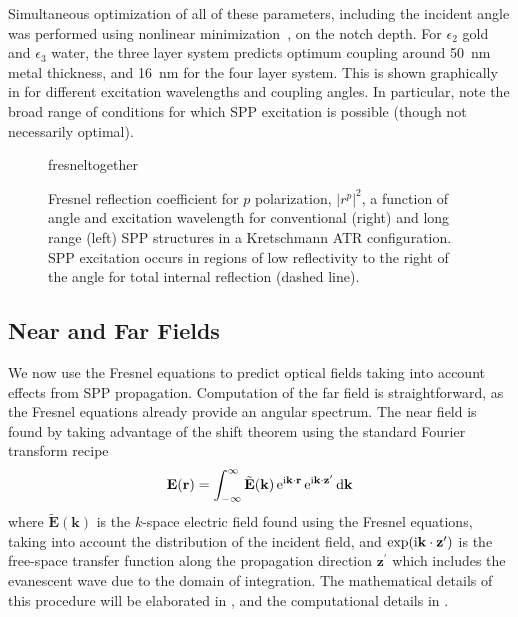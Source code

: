 Simultaneous optimization of all of these parameters, including the
incident angle was performed using nonlinear
minimization~\cite{brent1973algorithms}, on the notch depth.  For
$\epsilon_2$ gold and $\epsilon_3$ water, the three layer system predicts
optimum coupling around \SI{50}{\nano\meter} metal thickness, and
\SI{16}{\nano\meter} for the four layer system.  This is shown graphically
in  for different excitation wavelengths and
coupling angles.  In particular, note the broad range of conditions for
which SPP excitation is possible (though not necessarily optimal).

\begin{figure}[ht]
\centering
{fresneltogether}
\caption{Fresnel reflection coefficient for $p$ polarization, $|r^p|^2$, a
function of angle and excitation wavelength for conventional (right) and
long range (left) SPP structures in a Kretschmann ATR configuration.  SPP
excitation occurs in regions of low reflectivity to the right of the angle
for total internal reflection (dashed line).}
\label{fig:fresnelangle}
\end{figure}

\subsection{Near and Far Fields} \label{sec:fresnelnearfar}
We now use the Fresnel equations to predict optical fields taking into
account effects from SPP propagation.  Computation of the far field is
straightforward, as the Fresnel equations already provide an angular
spectrum.  The near field is found by taking advantage of the shift theorem
using the standard Fourier transform recipe
\begin{equation}
\mathbf{E}(\mathbf{r}) = \int_{-\infty}^{\infty} \tilde{\mathbf{E}}(\mathbf{k})
\,{\mathrm{e}}^{{\mathrm{i}} \mathbf{k} \cdot \mathbf{r}}
\,{\mathrm{e}}^{{\mathrm{i}} \mathbf{k} \cdot \mathbf{z}^\prime} \,\mathrm{d} \mathbf{k}
\end{equation}
where $\tilde{\mathbf{E}}(\mathbf{k})$ is the $k$-space electric field
found using the Fresnel equations, taking into account the distribution of
the incident field, and $\exp({\mathrm{i}} \mathbf{k} \cdot
\mathbf{z}^\prime)$ is the free-space transfer function along the 
propagation direction $\mathbf{z}^\prime$ which includes the evanescent
wave due to the domain of integration.  The mathematical details of this procedure
will be elaborated in , and the
computational details in .

